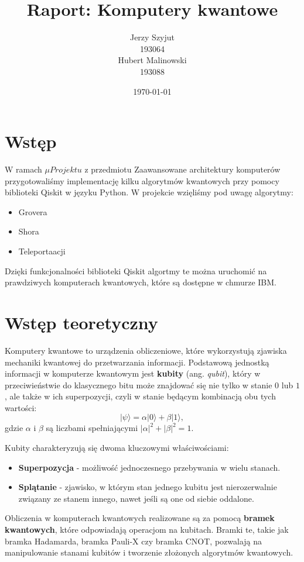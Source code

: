 \documentclass[a4paper,12pt]{article}
\title{Raport: Komputery kwantowe}
\author{Jerzy Szyjut \\
        193064 \\
        Hubert Malinowski \\
        193088}
\date{\today}
\begin{document}
\maketitle

\section{Wstęp}
W ramach $\mu Projektu$ z przedmiotu Zaawansowane architektury komputerów 
przygotowaliśmy implementację kilku algorytmów kwantowych przy pomocy biblioteki
Qiskit w języku Python. W projekcie wzięliśmy pod uwagę algorytmy:
\begin{itemize}
    \item Grovera
    \item Shora
    \item Teleportaacji
\end{itemize}
Dzięki funkcjonalności biblioteki Qiskit algortmy te można uruchomić
na prawdziwych komputerach kwantowych, które są dostępne w chmurze
IBM.

\section{Wstęp teoretyczny}
Komputery kwantowe to urządzenia obliczeniowe, które wykorzystują 
zjawiska mechaniki kwantowej do przetwarzania informacji. Podstawową 
jednostką informacji w komputerze kwantowym jest \textbf{kubity} 
(ang. \emph{qubit}), który w przeciwieństwie do klasycznego bitu może 
znajdować się nie tylko w stanie $0$ lub $1$, ale także w ich superpozycji, 
czyli w stanie będącym kombinacją obu tych wartości:
\[
|\psi\rangle = \alpha|0\rangle + \beta|1\rangle,
\]
gdzie $\alpha$ i $\beta$ są liczbami spełniającymi $|\alpha|^2 + |\beta|^2 = 1$.

\vspace{0.5cm}

Kubity charakteryzują się dwoma kluczowymi właściwościami:
\begin{itemize}
    \item \textbf{Superpozycja} - możliwość jednoczesnego przebywania w wielu 
    stanach.
    \item \textbf{Splątanie} - zjawisko, w którym stan jednego kubitu jest 
    nierozerwalnie związany ze stanem innego, nawet jeśli są one od siebie 
    oddalone.
\end{itemize}

Obliczenia w komputerach kwantowych realizowane są za pomocą 
\textbf{bramek kwantowych}, które odpowiadają operacjom na kubitach. 
Bramki te, takie jak bramka Hadamarda, bramka Pauli-X czy bramka CNOT, 
pozwalają na manipulowanie stanami kubitów i tworzenie złożonych algorytmów 
kwantowych.
\end{document}
